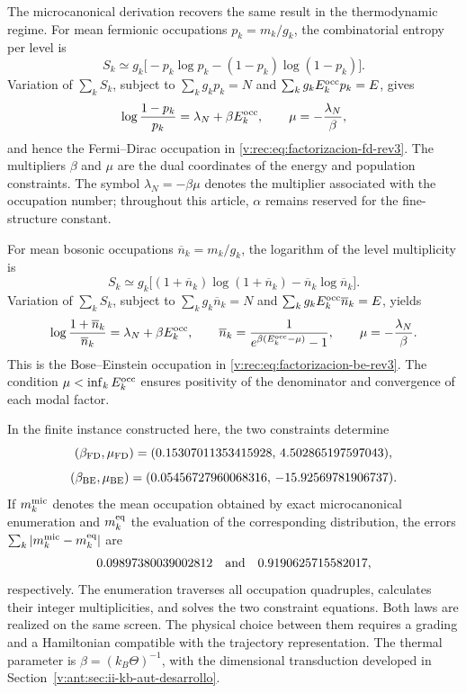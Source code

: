 The microcanonical derivation recovers the same result in the
thermodynamic regime. For mean fermionic occupations
\(p_k=m_k/g_k\), the combinatorial entropy per level is
\begin{equation}
 S_k\simeq
 g_k\bigl[-p_k\log p_k-(1-p_k)\log(1-p_k)\bigr].
 \label{v:rec:eq:entropia-fd-nivel-rev3}
\end{equation}
Variation of \(\sum_kS_k\), subject to
\(\sum_kg_kp_k=N\) and
\(\sum_kg_kE_k^{\rm occ}p_k=E\), gives
\begin{equation}
 \log\frac{1-p_k}{p_k}=\lambda_N+\beta E_k^{\rm occ},
 \qquad
 \mu=-\frac{\lambda_N}{\beta},
 \label{v:rec:eq:variacion-fd-rev3}
\end{equation}
and hence the Fermi--Dirac occupation in
\eqref{v:rec:eq:factorizacion-fd-rev3}. The multipliers \(\beta\) and \(\mu\)
are the dual coordinates of the energy and population constraints.
The symbol \(\lambda_N=-\beta\mu\) denotes the multiplier associated with
the occupation number; throughout this article, \(\alpha\) remains reserved
for the fine-structure constant.

For mean bosonic occupations
\(\overline n_k=m_k/g_k\), the logarithm of the level multiplicity is
\begin{equation}
 S_k\simeq
 g_k\bigl[(1+\overline n_k)\log(1+\overline n_k)
          -\overline n_k\log\overline n_k\bigr].
 \label{v:rec:eq:entropia-be-nivel-rev3}
\end{equation}
Variation of \(\sum_kS_k\), subject to
\(\sum_kg_k\overline n_k=N\) and
\(\sum_kg_kE_k^{\rm occ}\overline n_k=E\), yields
\begin{equation}
 \log\frac{1+\overline n_k}{\overline n_k}
 =\lambda_N+\beta E_k^{\rm occ},
 \qquad
 \overline n_k
 =\frac{1}{e^{\beta(E_k^{\rm occ}-\mu)}-1},
 \qquad
 \mu=-\frac{\lambda_N}{\beta}.
 \label{v:rec:eq:variacion-be-rev3}
\end{equation}
This is the Bose--Einstein occupation in
\eqref{v:rec:eq:factorizacion-be-rev3}. The condition
\(\mu<\inf_kE_k^{\rm occ}\) ensures positivity of the denominator and
convergence of each modal factor.

In the finite instance constructed here, the two constraints determine
\[
 (\beta_{\rm FD},\mu_{\rm FD})
 =(0.15307011353415928,\,4.502865197597043),
\]
\[
 (\beta_{\rm BE},\mu_{\rm BE})
 =(0.05456727960068316,\,-15.92569781906737).
\]
If \(m_k^{\rm mic}\) denotes the mean occupation obtained by exact
microcanonical enumeration and \(m_k^{\rm eq}\) the evaluation of the
corresponding distribution, the errors
\(\sum_k|m_k^{\rm mic}-m_k^{\rm eq}|\) are
\[
 0.09897380039002812\quad\hbox{and}\quad
 0.9190625715582017,
\]
respectively. The enumeration traverses all occupation quadruples,
calculates their integer multiplicities, and solves the two constraint
equations. Both laws are realized on the same screen. The physical
choice between them requires a grading and a Hamiltonian compatible with the
trajectory representation. The thermal parameter is
\(\beta=(k_B\Theta)^{-1}\), with the dimensional transduction developed in
Section~\ref{v:ant:sec:ii-kb-aut-desarrollo}.

